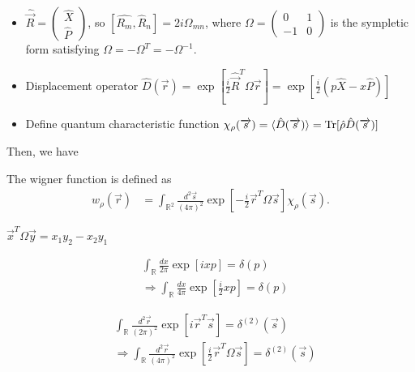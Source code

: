 \documentclass[../../note.tex]{subfiles}
\begin{document}
\begin{itemize}
    \item $\hat{\overrightarrow{R}} = \left(
        \begin{matrix}
            \hat{X} \\
            \hat{P}
        \end{matrix}
       \right)$, so $[\hat{R_m}, \hat{R}_n] = 2 i \Omega_{mn}$, where $\Omega = \left(
        \begin{matrix}
            0  & 1 \\
            -1 & 0
        \end{matrix}
       \right)$ is the sympletic form satisfying $\Omega = - \Omega^T = - \Omega^{-1}$.
    \item Displacement operator $\hat{D}(\overrightarrow{r}) = \exp\left[{\frac{i}{2} \hat{\overrightarrow{R}}^T \Omega \overrightarrow{r}}\right] = \exp\left[\frac{i}{2}(p \hat{X} - x \hat{P})\right]$
    \item Define quantum characteristic function $\chi_{\rho}(\overrightarrow{s}) = \langle \hat{D}(\overrightarrow{s})\rangle = \operatorname{Tr}[\hat{\rho}\hat{D}(\overrightarrow{s})]$
\end{itemize}
Then, we have
\begin{definition}
    The wigner function is defined as
    \begin{align}
        w_{\rho}(\overrightarrow{r})
        &= \int_{\mathbb{R}^2} \frac{d^2\overrightarrow{s}}{(4 \pi)^2} \exp\left[- \frac{i}{2} \overrightarrow{r}^T \Omega \overrightarrow{s}\right] \chi_{\rho}(\overrightarrow{s}).
    \end{align}
\end{definition}

\begin{remark}
    $\overrightarrow{x}^T \Omega \overrightarrow{y} = x_1 y_2 - x_2 y_1$

    \begin{align}
        &\int_{\mathbb{R}} \frac{d x}{2 \pi} \exp\left[i x p \right]
        = \delta(p) \\
        &\Longrightarrow   \int_{\mathbb{R}} \frac{d x}{4 \pi} \exp\left[\frac{i}{2} x p \right]= \delta(p)
    \end{align}

    \begin{align}
        &\int_{\mathbb{R}} \frac{d^2 \overrightarrow{r}}{(2 \pi)^2} \exp\left[i \overrightarrow{r}^T \overrightarrow{s} \right]
        = \delta^{(2)}(\overrightarrow{s}) \\
        &\Longrightarrow  \int_{\mathbb{R}} \frac{d^2 \overrightarrow{r}}{(4 \pi)^2} \exp\left[\frac{i}{2} \overrightarrow{r}^T \Omega \overrightarrow{s} \right]
        = \delta^{(2)}(\overrightarrow{s})
    \end{align}
\end{remark}
\end{document}
